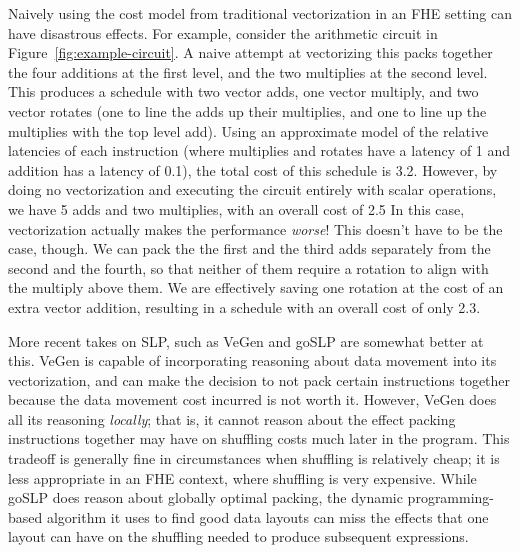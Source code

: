 Naively using the cost model from traditional vectorization in an FHE setting can have disastrous effects.
For example, consider the arithmetic circuit in Figure~\ref{fig:example-circuit}.
A naive attempt at vectorizing this packs together the four additions at the first level, and the two multiplies at the second level.
This produces a schedule with two vector adds, one vector multiply, and two vector rotates (one to line the adds up their multiplies, and one to line up the multiplies with the top level add).
Using an approximate model of the relative latencies of each instruction (where multiplies and rotates have a latency of 1 and addition has a latency of 0.1), the total cost of this schedule is 3.2.
However, by doing no vectorization and executing the circuit entirely with scalar operations, we have 5 adds and two multiplies, with an overall cost of 2.5
In this case, vectorization actually makes the performance {\em worse}!
This doesn't have to be the case, though.
We can pack the the first and the third adds separately from the second and the fourth, so that neither of them require a rotation to align with the multiply above them.
We are effectively saving one rotation at the cost of an extra vector addition, resulting in a schedule with an overall cost of only 2.3. 

More recent takes on SLP, such as VeGen \cite{VeGen} and goSLP \cite{goSLP} are somewhat better at this.
VeGen is capable of incorporating reasoning about data movement into its vectorization, and can make the decision to not pack certain instructions together because the data movement cost incurred is not worth it.
However, VeGen does all its reasoning {\em locally}; that is, it cannot reason about the effect packing instructions together may have on shuffling costs much later in the program. This tradeoff is generally fine in circumstances when shuffling is relatively cheap; it is less appropriate in an FHE context, where shuffling is very expensive.
While goSLP does reason about globally optimal packing, the dynamic programming-based algorithm it uses to find good data layouts can miss the effects that one layout can have on the shuffling needed to produce subsequent expressions. %

